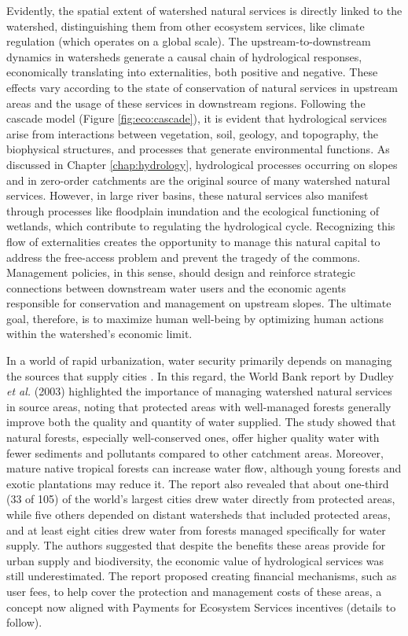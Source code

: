 \documentclass[./main_en.tex]{subfiles}
\begin{document}
\par Evidently, the spatial extent of watershed natural services is directly linked to the watershed, distinguishing them from other ecosystem services, like climate regulation (which operates on a global scale). The upstream-to-downstream dynamics in watersheds generate a causal chain of hydrological responses, economically translating into externalities, both positive and negative. These effects vary according to the state of conservation of natural services in upstream areas and the usage of these services in downstream regions. Following the cascade model (Figure \ref{fig:eco:cascade}), it is evident that hydrological services arise from interactions between vegetation, soil, geology, and topography, the biophysical structures, and processes that generate environmental functions. As discussed in Chapter \ref{chap:hydrology}, hydrological processes occurring on slopes and in zero-order catchments are the original source of many watershed natural services. However, in large river basins, these natural services also manifest through processes like floodplain inundation and the ecological functioning of wetlands, which contribute to regulating the hydrological cycle. Recognizing this flow of externalities creates the opportunity to manage this natural capital to address the free-access problem and prevent the tragedy of the commons. Management policies, in this sense, should design and reinforce strategic connections between downstream water users and the economic agents responsible for conservation and management on upstream slopes. The ultimate goal, therefore, is to maximize human well-being by optimizing human actions within the watershed’s economic limit.

\par In a world of rapid urbanization, water security primarily depends on managing the sources that supply cities \cite{Liu2024}. In this regard, the World Bank report by Dudley \textit{et al.} (2003) \cite{Dudley2003a} highlighted the importance of managing watershed natural services in source areas, noting that protected areas with well-managed forests generally improve both the quality and quantity of water supplied. The study showed that natural forests, especially well-conserved ones, offer higher quality water with fewer sediments and pollutants compared to other catchment areas. Moreover, mature native tropical forests can increase water flow, although young forests and exotic plantations may reduce it. The report also revealed that about one-third (33 of 105) of the world's largest cities drew water directly from protected areas, while five others depended on distant watersheds that included protected areas, and at least eight cities drew water from forests managed specifically for water supply. The authors suggested that despite the benefits these areas provide for urban supply and biodiversity, the economic value of hydrological services was still underestimated. The report proposed creating financial mechanisms, such as user fees, to help cover the protection and management costs of these areas, a concept now aligned with Payments for Ecosystem Services incentives (details to follow).
\end{document}
